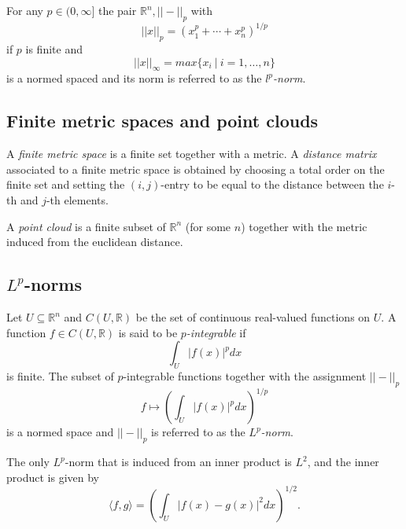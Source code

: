 \documentclass{amsart}
\begin{document}
	For any $p \in (0,\infty]$ the pair $\mathbb R^n, ||-||_p$ with 
	\begin{equation*}
	||x||_p = (x_1^p + \cdots + x_n^p)^{1/p}
	\end{equation*}
	if $p$ is finite and 
	\begin{equation*}
	||x||_{\infty} = max\{x_i\ |\ i = 1,\dots,n\}
	\end{equation*}
	is a normed spaced and its norm is referred to as the $l^p$\textit{-norm}.
	
	\subsection*{Finite metric spaces and point clouds} \label{finite_metric_spaces_and_point_clouds}
	
	A \textit{finite metric space} is a finite set together with a 
	metric. A \textit{distance matrix} associated to a finite metric space is obtained by choosing a total order on the finite set and setting the $(i,j)$-entry to be equal to the distance between the $i$-th and $j$-th elements. 
	
	A \textit{point cloud} is a finite subset of $\mathbb{R}^n$ (for some $n$) together with the metric induced from the
	euclidean distance.
	
	\subsection*{$L^p$-norms} \label{functional_lp}
	
	Let $U \subseteq \mathbb R^n$ and $C(U, \mathbb R)$ be the set of continuous real-valued functions on $U$. A function $f \in C(U, \mathbb R)$ is said to be $p$\textit{-integrable} if
	\begin{equation*}
	\int_U |f(x)|^p dx
	\end{equation*}
	is finite. The subset of $p$-integrable functions together with the assignment $||-||_p$
	\begin{equation*}
	f \mapsto \left( \int_U |f(x)|^p dx \right)^{1/p}
	\end{equation*}
	is a
	normed space and $||-||_p$ is referred to as the $L^p$\textit{-norm}.
	
	The only $L^p$-norm that is induced from an inner product is $L^2$, and the inner product is given by
	\begin{equation*}
	\langle f, g \rangle = \left(\int_U |f(x)-g(x)|^2 dx\right)^{1/2}.
	\end{equation*}
\end{document}
